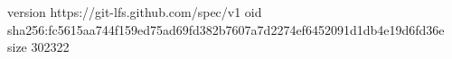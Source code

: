 version https://git-lfs.github.com/spec/v1
oid sha256:fc5615aa744f159ed75ad69fd382b7607a7d2274ef6452091d1db4e19d6fd36e
size 302322
